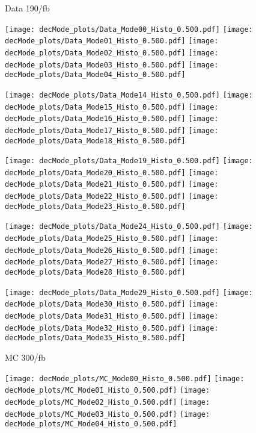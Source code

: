\documentclass{article}
\begin{document}
Data 190/fb
\newline

\texttt{[image: decMode\_plots/Data\_Mode00\_Histo\_0.500.pdf]}
\texttt{[image: decMode\_plots/Data\_Mode01\_Histo\_0.500.pdf]}
\texttt{[image: decMode\_plots/Data\_Mode02\_Histo\_0.500.pdf]}
\texttt{[image: decMode\_plots/Data\_Mode03\_Histo\_0.500.pdf]}
\texttt{[image: decMode\_plots/Data\_Mode04\_Histo\_0.500.pdf]}

\texttt{[image: decMode\_plots/Data\_Mode14\_Histo\_0.500.pdf]}
\texttt{[image: decMode\_plots/Data\_Mode15\_Histo\_0.500.pdf]}
\texttt{[image: decMode\_plots/Data\_Mode16\_Histo\_0.500.pdf]}
\texttt{[image: decMode\_plots/Data\_Mode17\_Histo\_0.500.pdf]}
\texttt{[image: decMode\_plots/Data\_Mode18\_Histo\_0.500.pdf]}

\texttt{[image: decMode\_plots/Data\_Mode19\_Histo\_0.500.pdf]}
\texttt{[image: decMode\_plots/Data\_Mode20\_Histo\_0.500.pdf]}
\texttt{[image: decMode\_plots/Data\_Mode21\_Histo\_0.500.pdf]}
\texttt{[image: decMode\_plots/Data\_Mode22\_Histo\_0.500.pdf]}
\texttt{[image: decMode\_plots/Data\_Mode23\_Histo\_0.500.pdf]}

\texttt{[image: decMode\_plots/Data\_Mode24\_Histo\_0.500.pdf]}
\texttt{[image: decMode\_plots/Data\_Mode25\_Histo\_0.500.pdf]}
\texttt{[image: decMode\_plots/Data\_Mode26\_Histo\_0.500.pdf]}
\texttt{[image: decMode\_plots/Data\_Mode27\_Histo\_0.500.pdf]}
\texttt{[image: decMode\_plots/Data\_Mode28\_Histo\_0.500.pdf]}

\texttt{[image: decMode\_plots/Data\_Mode29\_Histo\_0.500.pdf]}
\texttt{[image: decMode\_plots/Data\_Mode30\_Histo\_0.500.pdf]}
\texttt{[image: decMode\_plots/Data\_Mode31\_Histo\_0.500.pdf]}
\texttt{[image: decMode\_plots/Data\_Mode32\_Histo\_0.500.pdf]}
\texttt{[image: decMode\_plots/Data\_Mode35\_Histo\_0.500.pdf]}

\newpage

MC 300/fb
\newline

\texttt{[image: decMode\_plots/MC\_Mode00\_Histo\_0.500.pdf]}
\texttt{[image: decMode\_plots/MC\_Mode01\_Histo\_0.500.pdf]}
\texttt{[image: decMode\_plots/MC\_Mode02\_Histo\_0.500.pdf]}
\texttt{[image: decMode\_plots/MC\_Mode03\_Histo\_0.500.pdf]}
\texttt{[image: decMode\_plots/MC\_Mode04\_Histo\_0.500.pdf]}
\end{document}
